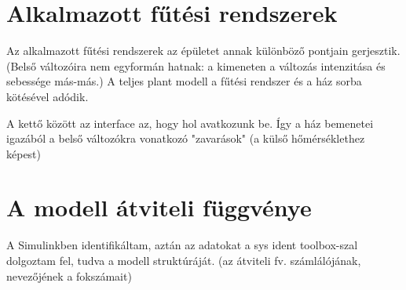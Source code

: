 \section{Alkalmazott fűtési rendszerek}

Az alkalmazott fűtési rendszerek az épületet annak különböző pontjain gerjesztik. (Belső változóira nem egyformán hatnak: a kimeneten a változás intenzitása és sebessége más-más.) A teljes plant modell a fűtési rendszer és a ház sorba kötésével adódik.

A kettő között az interface az, hogy hol avatkozunk be. Így a ház bemenetei igazából a belső változókra vonatkozó "zavarások" (a külső hőmérséklethez képest)

\section{A modell átviteli függvénye}
A Simulinkben identifikáltam, aztán az adatokat a sys ident toolbox-szal dolgoztam fel, tudva a modell struktúráját. (az átviteli fv. számlálójának, nevezőjének a fokszámait)



\pagebreak
